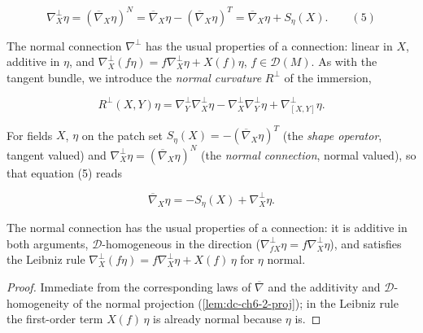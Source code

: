 $$
\nabla_X^\perp\eta=(\overline{\nabla}_X\eta)^N=\overline{\nabla}_X\eta-(\overline{\nabla}_X\eta)^T=\overline{\nabla}_X\eta+S_\eta(X).\qquad(5)
$$

The normal connection $\nabla^\perp$ has the usual properties of a connection:
linear in $X$, additive in $\eta$, and
$\nabla_X^\perp(f\eta)=f\nabla_X^\perp\eta+X(f)\eta$, $f\in\mathcal{D}(M)$. As with
the tangent bundle, we introduce the \emph{normal curvature} $R^\perp$ of the immersion,

$$
R^\perp(X,Y)\eta=\nabla_Y^\perp\nabla_X^\perp\eta-\nabla_X^\perp\nabla_Y^\perp\eta+\nabla_{[X,Y]}^\perp\eta.
$$

\begin{definition}
  \label{def:dc-ch6-3-normal-connection}
  \leanok
  For fields $X$, $\eta$ on the patch set
  $S_\eta(X)=-(\overline{\nabla}_X\eta)^T$ (the \emph{shape operator}, tangent
  valued) and $\nabla^\perp_X\eta=(\overline{\nabla}_X\eta)^N$ (the \emph{normal
  connection}, normal valued), so that equation (5) reads

  $$
  \overline{\nabla}_X\eta=-S_\eta(X)+\nabla^\perp_X\eta.
  $$
\end{definition}

\begin{proposition}
  \label{prop:dc-ch6-3-normal-connection-laws}
  \leanok
  The normal connection has the usual properties of a connection: it is
  additive in both arguments, $\mathcal{D}$-homogeneous in the direction
  ($\nabla^\perp_{fX}\eta=f\nabla^\perp_X\eta$), and satisfies the Leibniz rule
  $\nabla^\perp_X(f\eta)=f\nabla^\perp_X\eta+X(f)\,\eta$ for $\eta$ normal.
\end{proposition}
\begin{proof}
  \leanok
  Immediate from the corresponding laws of $\overline{\nabla}$ and the
  additivity and $\mathcal{D}$-homogeneity of the normal projection
  (\cref{lem:dc-ch6-2-proj}); in the Leibniz rule the first-order term
  $X(f)\,\eta$ is already normal because $\eta$ is.
\end{proof}

